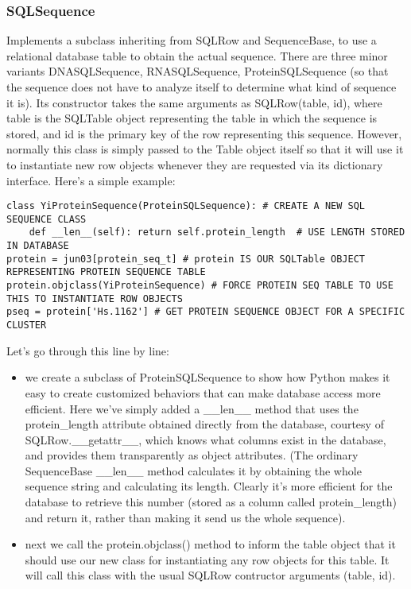 \documentclass{howto}
\begin{document}
\subsubsection{SQLSequence}

Implements a subclass inheriting from SQLRow and SequenceBase, to use a relational database table to obtain the actual sequence.  There are three minor variants DNASQLSequence, RNASQLSequence, ProteinSQLSequence (so that the sequence does not have to analyze itself to determine what kind of sequence it is).  Its constructor takes the same arguments as SQLRow(table, id), where table is the SQLTable object representing the table in which the sequence is stored, and id is the primary key of the row representing this sequence.  However, normally this class is simply passed to the Table object itself so that it will use it to instantiate new row objects whenever they are requested via its dictionary interface.  Here's a simple example:

\begin{verbatim}
class YiProteinSequence(ProteinSQLSequence): # CREATE A NEW SQL SEQUENCE CLASS
    def __len__(self): return self.protein_length  # USE LENGTH STORED IN DATABASE
protein = jun03[protein_seq_t] # protein IS OUR SQLTable OBJECT REPRESENTING PROTEIN SEQUENCE TABLE
protein.objclass(YiProteinSequence) # FORCE PROTEIN SEQ TABLE TO USE THIS TO INSTANTIATE ROW OBJECTS
pseq = protein['Hs.1162'] # GET PROTEIN SEQUENCE OBJECT FOR A SPECIFIC CLUSTER
\end{verbatim}

Let's go through this line by line:

\begin{itemize}

\item
we create a subclass of ProteinSQLSequence to show how Python makes it easy to create customized behaviors that can make database access more efficient.  Here we've simply added a __len__ method that uses the protein_length attribute obtained directly from the database, courtesy of SQLRow.__getattr__, which knows what columns exist in the database, and provides them transparently as object attributes.  (The ordinary SequenceBase __len__ method calculates it by obtaining the whole sequence string and calculating its length.  Clearly it's more efficient for the database to retrieve this number (stored as a column called protein_length) and return it, rather than making it send us the whole sequence).

\item
next we call the protein.objclass() method to inform the table object that it should use our new class for instantiating any row objects for this table.  It will call this class with the usual SQLRow contructor arguments (table, id).
\end{itemize}
\end{document}
